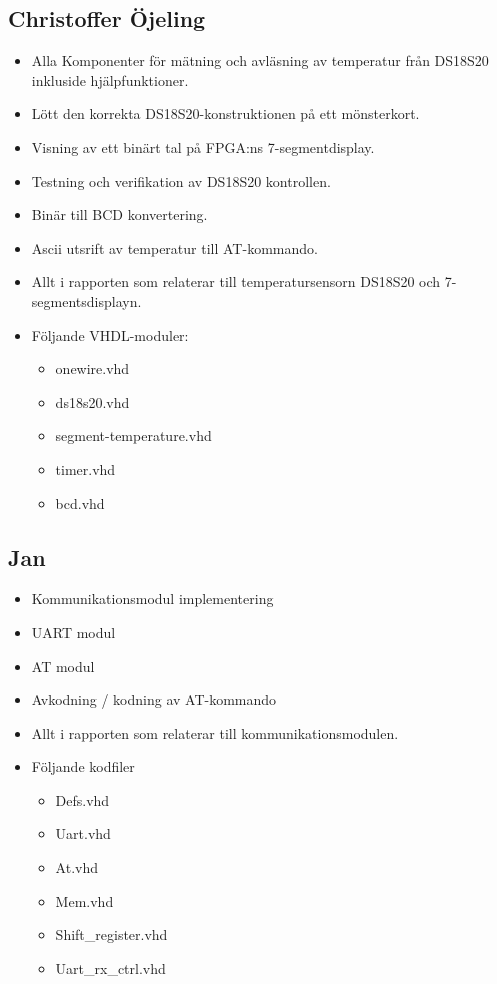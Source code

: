 \documentclass[a4paper]{scrartcl}
\begin{document}
\subsection{Christoffer Öjeling}
\begin{itemize}
	\item Alla Komponenter för mätning och avläsning av temperatur från DS18S20 inkluside hjälpfunktioner.
	\item Lött den korrekta DS18S20-konstruktionen på ett mönsterkort.
	\item Visning av ett binärt tal på FPGA:ns 7-segmentdisplay.
	\item Testning och verifikation av DS18S20 kontrollen.
	\item Binär till BCD konvertering.
	\item Ascii utsrift av temperatur till AT-kommando.
	\item Allt i rapporten som relaterar till temperatursensorn DS18S20 och 7-segmentsdisplayn.
	\item Följande VHDL-moduler:
	\begin{itemize}
		\item onewire.vhd
		\item ds18s20.vhd
		\item segment-temperature.vhd
		\item timer.vhd
		\item bcd.vhd
	\end{itemize}
\end{itemize}

\subsection{Jan}
\begin{itemize}
	\item Kommunikationsmodul implementering
	\item UART modul
	\item AT modul
	\item Avkodning / kodning av AT-kommando
	\item Allt i rapporten som relaterar till kommunikationsmodulen.
	\item Följande kodfiler
		\begin{itemize}
		\item Defs.vhd
		\item Uart.vhd
		\item At.vhd
		\item Mem.vhd
		\item Shift\_register.vhd
		\item Uart\_rx\_ctrl.vhd
		\end{itemize}
\end{itemize}
\end{document}
